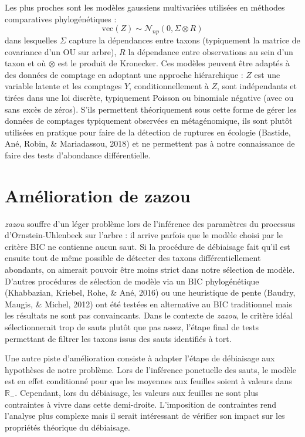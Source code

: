 \documentclass[12pt,a4paper]{reedthesis}
\newcommand \RR {\mathbb{R}}
\theoremstyle{definition}
\theoremstyle{definition}
\theoremstyle{definition}
\theoremstyle{remark}
\begin{document}
Les plus proches sont les modèles gaussiens multivariées utilisées en méthodes comparatives phylogénétiques :
\begin{equation*}
\text{vec}(Z) \sim \mathcal{N}_{np}\left(0, \Sigma \otimes R\right)
\end{equation*}
dans lesquelles \(\Sigma\) capture la dépendances entre taxons (typiquement la matrice de covariance d'un OU sur arbre), \(R\) la dépendance entre observations au sein d'un taxon et où \(\otimes\) est le produit de Kronecker. Ces modèles peuvent être adaptés à des données de comptage en adoptant une approche hiérarchique : \(Z\) est une variable latente et les comptages \(Y\), conditionnellement à \(Z\), sont indépendants et tirées dans une loi discrète, typiquement Poisson ou binomiale négative (avec ou sans excès de zéros). S'ils permettent théoriquement sous cette forme de gérer les données de comptages typiquement observées en métagénomique, ils sont plutôt utilisées en pratique pour faire de la détection de ruptures en écologie (Bastide, Ané, Robin, \& Mariadassou, 2018) et ne permettent pas à notre connaissance de faire des tests d'abondance différentielle.

\hypertarget{amuxe9lioration-de-zazou}{%
\section*{Amélioration de zazou}\label{amuxe9lioration-de-zazou}}

\emph{zazou} souffre d'un léger problème lors de l'inférence des paramètres du processus d'Ornstein-Uhlenbeck sur l'arbre : il arrive parfois que le modèle choisi par le critère BIC ne contienne aucun saut. Si la procédure de débiaisage fait qu'il est ensuite tout de même possible de détecter des taxons différentiellement abondants, on aimerait pouvoir être moins strict dans notre sélection de modèle. D'autres procédures de sélection de modèle via un BIC phylogénétique (Khabbazian, Kriebel, Rohe, \& Ané, 2016) ou une heuristique de pente (Baudry, Maugis, \& Michel, 2012) ont été testées en alternative au BIC traditionnel mais les résultats ne sont pas convaincants. Dans le contexte de \emph{zazou}, le critère idéal sélectionnerait trop de sauts plutôt que pas assez, l'étape final de tests permettant de filtrer les taxons issus des sauts identifiés à tort.

Une autre piste d'amélioration consiste à adapter l'étape de débiaisage aux hypothèses de notre problème. Lors de l'inférence ponctuelle des sauts, le modèle est en effet conditionné pour que les moyennes aux feuilles soient à valeurs dans \(\RR_-\). Cependant, lors du débiaisage, les valeurs aux feuilles ne sont plus contraintes à vivre dans cette demi-droite. L'imposition de contraintes rend l'analyse plus complexe mais il serait intéressant de vérifier son impact sur les propriétés théorique du débiaisage.
\end{document}
